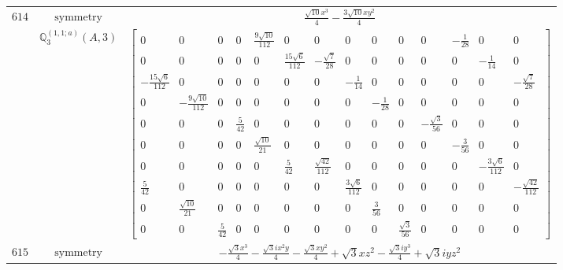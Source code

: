 \documentclass[fleqn,8pt,landscape]{jsarticle}
\begin{document}
\begin{longtable}{ccc}
$ 614 $ & $ \text{symmetry} $ & $ \frac{\sqrt{10} x^{3}}{4} - \frac{3 \sqrt{10} x y^{2}}{4} $ \\
$  $ & $ \mathbb{Q}_{3}^{(1,1;a)}(A,3) $ & $ \begin{bmatrix} 0 & 0 & 0 & 0 & \frac{9 \sqrt{10}}{112} & 0 & 0 & 0 & 0 & 0 & 0 & - \frac{1}{28} & 0 & 0 \\ 0 & 0 & 0 & 0 & 0 & \frac{15 \sqrt{6}}{112} & - \frac{\sqrt{7}}{28} & 0 & 0 & 0 & 0 & 0 & - \frac{1}{14} & 0 \\ - \frac{15 \sqrt{6}}{112} & 0 & 0 & 0 & 0 & 0 & 0 & - \frac{1}{14} & 0 & 0 & 0 & 0 & 0 & - \frac{\sqrt{7}}{28} \\ 0 & - \frac{9 \sqrt{10}}{112} & 0 & 0 & 0 & 0 & 0 & 0 & - \frac{1}{28} & 0 & 0 & 0 & 0 & 0 \\ 0 & 0 & 0 & \frac{5}{42} & 0 & 0 & 0 & 0 & 0 & 0 & - \frac{\sqrt{3}}{56} & 0 & 0 & 0 \\ 0 & 0 & 0 & 0 & \frac{\sqrt{10}}{21} & 0 & 0 & 0 & 0 & 0 & 0 & - \frac{3}{56} & 0 & 0 \\ 0 & 0 & 0 & 0 & 0 & \frac{5}{42} & \frac{\sqrt{42}}{112} & 0 & 0 & 0 & 0 & 0 & - \frac{3 \sqrt{6}}{112} & 0 \\ \frac{5}{42} & 0 & 0 & 0 & 0 & 0 & 0 & \frac{3 \sqrt{6}}{112} & 0 & 0 & 0 & 0 & 0 & - \frac{\sqrt{42}}{112} \\ 0 & \frac{\sqrt{10}}{21} & 0 & 0 & 0 & 0 & 0 & 0 & \frac{3}{56} & 0 & 0 & 0 & 0 & 0 \\ 0 & 0 & \frac{5}{42} & 0 & 0 & 0 & 0 & 0 & 0 & \frac{\sqrt{3}}{56} & 0 & 0 & 0 & 0 \end{bmatrix} $ \\ \hline
$ 615 $ & $ \text{symmetry} $ & $ - \frac{\sqrt{3} x^{3}}{4} - \frac{\sqrt{3} i x^{2} y}{4} - \frac{\sqrt{3} x y^{2}}{4} + \sqrt{3} x z^{2} - \frac{\sqrt{3} i y^{3}}{4} + \sqrt{3} i y z^{2} $ \\

\end{longtable}
\end{document}
